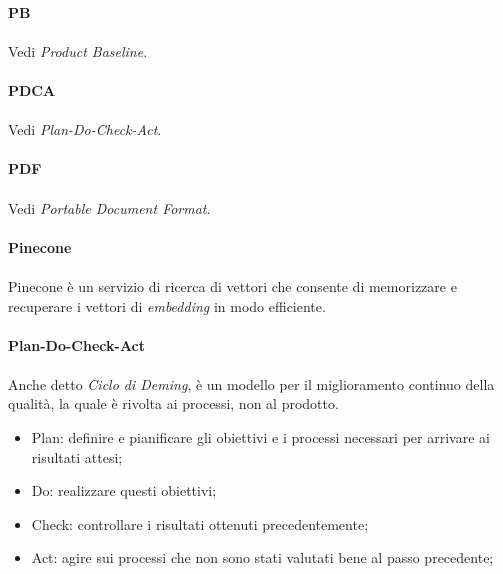 \documentclass[10pt, a4paper]{article}
\begin{document}
\vspace{2em}
\paragraph{PB}\noindent\hrulefill 
\paragraph{}Vedi \textit{Product Baseline\pg}.

\vspace{2em}
\paragraph{PDCA}\noindent\hrulefill 
\paragraph{}Vedi \textit{Plan-Do-Check-Act\pg}.

\paragraph{PDF}\noindent\hrulefill 
\paragraph{}Vedi \textit{Portable Document Format\pg}.

\vspace{2em}
\paragraph{Pinecone}\noindent\hrulefill
\paragraph{}Pinecone è un servizio di ricerca di vettori che consente di memorizzare e recuperare i vettori di \textit{embedding} in modo efficiente.


\vspace{2em}
\paragraph{Plan-Do-Check-Act}\noindent\hrulefill
\paragraph{}Anche detto \textit{Ciclo di Deming}, è un modello per il
miglioramento continuo della qualità, la quale è rivolta ai processi, non al prodotto.
\begin{itemize}
    \item Plan: definire e pianificare gli obiettivi e i processi necessari per arrivare ai risultati attesi;
    \item Do: realizzare questi obiettivi;
    \item Check: controllare i risultati ottenuti precedentemente;
    \item Act: agire sui processi che non sono stati valutati bene al passo precedente;
\end{itemize}
\end{document}
